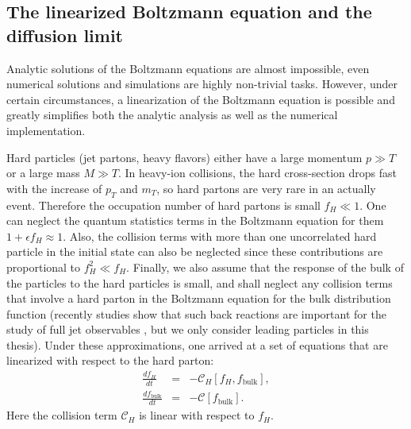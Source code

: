 \subsection{The linearized Boltzmann equation and the diffusion limit}
Analytic solutions of the Boltzmann equations are almost impossible, even numerical solutions and simulations are highly non-trivial tasks.
However, under certain circumstances, a linearization of the Boltzmann equation is possible and greatly simplifies both the analytic analysis as well as the numerical implementation.

Hard particles (jet partons, heavy flavors) either have a large momentum $p\gg T$ or a large mass $M \gg T$. 
In heavy-ion collisions, the hard cross-section drops fast with the increase of $p_T$ and $m_T$, so hard partons are very rare in an actually event. 
Therefore the occupation number of hard partons is small $f_H \ll 1$.
One can neglect the quantum statistics terms in the Boltzmann equation for them $1+\epsilon f_H \approx 1$.
Also, the collision terms with more than one uncorrelated hard particle in the initial state can also be neglected since these contributions are proportional to $f_H^2 \ll f_H$. 
Finally, we also assume that the response of the bulk of the particles to the hard particles is small, and shall neglect any collision terms that involve a hard parton in the Boltzmann equation for the bulk distribution function (recently studies show that such back reactions are important for the study of full jet observables \cite{PhysRevC.99.054911}, but we only consider leading particles in this thesis).
Under these approximations, one arrived at a set of equations that are linearized with respect to the hard parton:
\begin{eqnarray}
\frac{df_H}{dt} &=& -\mathcal{C}_H[f_H, f_{\textrm{bulk}}], \label{eq:hard-bulk-eq}\\
\frac{df_{\textrm{bulk}}}{dt} &=& -\mathcal{C}[f_{\textrm{bulk}}].
\end{eqnarray}
Here the collision term $\mathcal{C}_H$ is linear with respect to $f_H$.

